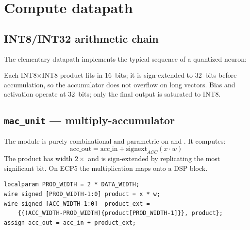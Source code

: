 \chapter{Compute datapath}
\label{ch:datapath}

\section{INT8/INT32 arithmetic chain}
The elementary datapath implements the typical sequence of a quantized neuron:
\begin{center}
\end{center}
Each INT8$\times$INT8 product fits in 16~bits; it is sign-extended to 32~bits before
accumulation, so the accumulator does not overflow on long vectors. Bias and activation
operate at 32~bits; only the final output is saturated to INT8.

\section{\texttt{mac\_unit} --- multiply-accumulator}
The  module is purely combinational and parametric on 
and . It computes:
\[
\mathrm{acc\_out} = \mathrm{acc\_in} + \mathrm{signext}_{ACC}(x \cdot w)
\]
The product has width $2\times$ and is sign-extended by replicating
the most significant bit. On ECP5 the multiplication maps onto a  DSP
block.

\begin{lstlisting}[caption={\texttt{rtl/mac\_unit.v} --- arithmetic core},label={lst:macunit}]
localparam PROD_WIDTH = 2 * DATA_WIDTH;
wire signed [PROD_WIDTH-1:0] product = x * w;
wire signed [ACC_WIDTH-1:0]  product_ext =
    {{(ACC_WIDTH-PROD_WIDTH){product[PROD_WIDTH-1]}}, product};
assign acc_out = acc_in + product_ext;
\end{lstlisting}

